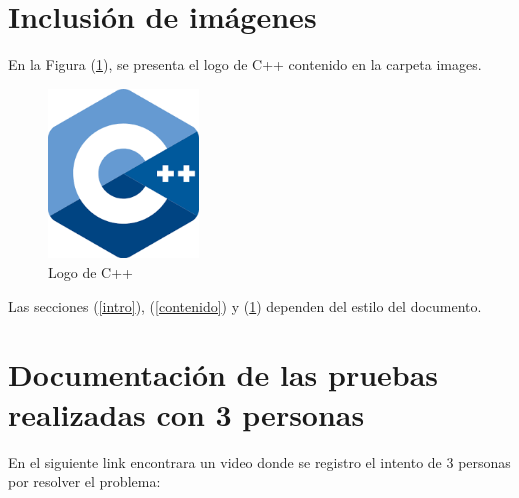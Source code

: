 \documentclass{article}
\begin{document}
\section{Inclusión de imágenes} \label{imagenes}

En la Figura (\ref{fig:cpplogo}), se presenta el logo de C++ contenido en la carpeta images.

\begin{figure}[h]
\includegraphics[width=4cm]{cpplogo.png}
\centering
\caption{Logo de C++}
\label{fig:cpplogo}
\end{figure}

Las secciones (\ref{intro}), (\ref{contenido}) y (\ref{imagenes}) dependen del estilo del documento.


\section{Documentación de las pruebas realizadas con 3 personas}
En el siguiente link encontrara un video donde se registro el intento de 3 personas por resolver el problema:
\end{document}
